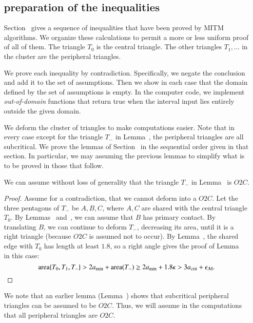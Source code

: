 \subsection{preparation of the inequalities}

Section~ gives a sequence of inequalities that have been
proved by MITM algorithms.  We organize these calculations to permit a
more or less uniform proof of all of them.  The triangle $T_0$ is  the
central triangle.  The other triangles $T_1,\ldots$ in the cluster are the
peripheral triangles.

We prove each inequality by contradiction. Specifically, we negate the
conclusion and add it to the set of assumptions.  Then we show in each
case that the domain defined by the set of assumptions is empty. In
the computer code, we implement {\it out-of-domain} functions that
return true when the interval input lies entirely outside the given
domain.

We deform the cluster of triangles to make computations easier.  Note
that in every case except for the triangle $T_-$ in
Lemma~, the peripheral triangles are all
subcritical.  We prove the lemmas of Section~ in the
sequential order given in that section.  In particular, we may
assuming the previous lemmas to simplify what is to be proved in those
that follow.

\begin{lemma}  
  We can assume without loss of generality that the triangle $T_-$ in
  Lemma~ is $O2C$.
\end{lemma}

\begin{proof} 
  Assume for a contradiction, that we cannot deform into a $O2C$.  Let
  the three pentagons of $T_-$ be $A,B,C$, where $A,C$ are shared with
  the central triangle $T_0$.  By Lemmas~
  and~, we can assume that $B$ has primary
  contact.  By translating $B$, we can continue to deform $T_-$,
  decreasing its area, until it is a right triangle (because $O2C$ is
  assumed not to occur).  By Lemma~, the shared edge
  with $T_0$ has length at least $1.8$, so a right angle gives the
  proof of Lemma~ in this case:
\[
{\operatorname{area}}\{T_0,T_1,T_-\} > 2a_\text{min} + {\operatorname{area}}(T_-) 
\ge 2a_\text{min} + 1.8\kappa > 3a_\text{crit} + \epsilon_{\mathcal M}.
\]
\end{proof}


We note that an earlier lemma (Lemma~) shows that
subcritical peripheral triangles can be assumed to be $O2C$. Thus, we
will assume in the computations that all peripheral triangles are
$O2C$.

